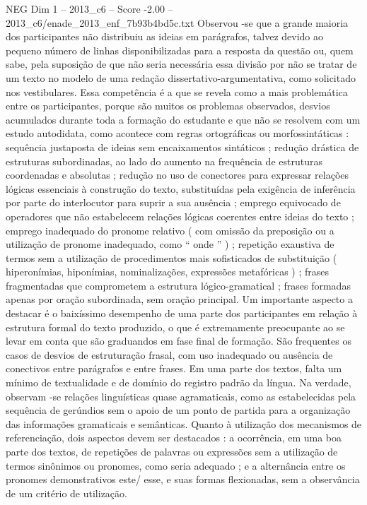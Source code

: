 \begin{textsample}{NEG Dim 1 – 2013\_c6 – Score -2.00 – 2013\_c6/enade\_2013\_enf\_7b93b4bd5c.txt}
Observou -se que a grande maioria dos participantes não distribuiu as ideias em parágrafos, talvez devido ao pequeno número de linhas disponibilizadas para a resposta da questão ou, quem sabe, pela suposição de que não seria necessária essa divisão por não se tratar de um texto no modelo de uma redação dissertativo-argumentativa, como solicitado nos vestibulares.
Essa competência é a que se revela como a mais problemática entre os participantes, porque são muitos os problemas observados, desvios acumulados durante toda a formação do estudante e que não se resolvem com um estudo autodidata, como acontece com regras ortográficas ou morfossintáticas : sequência justaposta de ideias sem encaixamentos sintáticos ; redução drástica de estruturas subordinadas, ao lado do aumento na frequência de estruturas coordenadas e absolutas ; redução no uso de conectores para expressar relações lógicas essenciais à construção do texto, substituídas pela exigência de inferência por parte do interlocutor para suprir a sua ausência ; emprego equivocado de operadores que não estabelecem relações lógicas coerentes entre ideias do texto ; emprego inadequado do pronome relativo ( com omissão da preposição ou a utilização de pronome inadequado, como “ onde ” ) ; repetição exaustiva de termos sem a utilização de procedimentos mais sofisticados de substituição ( hiperonímias, hiponímias, nominalizações, expressões metafóricas ) ; frases fragmentadas que comprometem a estrutura lógico-gramatical ; frases formadas apenas por oração subordinada, sem oração principal.
Um importante aspecto a destacar é o baixíssimo desempenho de uma parte dos participantes em relação à estrutura formal do texto produzido, o que é extremamente preocupante ao se levar em conta que são graduandos em fase final de formação.
São frequentes os casos de desvios de estruturação frasal, com uso inadequado ou ausência de conectivos entre parágrafos e entre frases.
Em uma parte dos textos, falta um mínimo de textualidade e de domínio do registro padrão da língua.
Na verdade, observam -se relações linguísticas quase agramaticais, como as estabelecidas pela sequência de gerúndios sem o apoio de um ponto de partida para a organização das informações gramaticais e semânticas.
Quanto à utilização dos mecanismos de referenciação, dois aspectos devem ser destacados : a ocorrência, em uma boa parte dos textos, de repetições de palavras ou expressões sem a utilização de termos sinônimos ou pronomes, como seria adequado ; e a alternância entre os pronomes demonstrativos este/ esse, e suas formas flexionadas, sem a observância de um critério de utilização.

\end{textsample}
